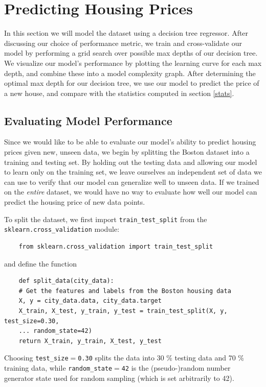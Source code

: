 \documentclass[12 pt]{article}
\numberwithin{equation}{section}
\begin{document}
\section{Predicting Housing Prices}\label{predict}
In this section we will model the dataset using a decision tree regressor. After discussing our choice of performance metric, we train and cross-validate our model by performing a grid  search over possible max depths of our decision tree. We visualize our model's performance by plotting the learning curve for each max depth, and combine these into a model complexity graph. After determining the  optimal max depth for our decision tree, we use our model to predict the price of a new house, and compare with the statistics computed in section \ref{stats}.
\subsection{Evaluating Model Performance}
Since we would like to be able to evaluate our model's ability to predict housing prices given new, unseen data, we begin by splitting the Boston dataset into a training and testing set. By holding out the testing data and allowing our model to learn only on the training set, we leave ourselves an independent set of data we can use to verify that our model can generalize well to unseen data. If we trained on the \emph{entire} dataset, we would have no way to evaluate how well our model can predict the housing price of new data points.

To split the dataset, we first import \texttt{train\_test\_split} from the \texttt{sklearn.cross\_validation} module:
\begin{verbatim}
	from sklearn.cross_validation import train_test_split
\end{verbatim}
and define the function 
\begin{verbatim}
	def split_data(city_data):
    # Get the features and labels from the Boston housing data
    X, y = city_data.data, city_data.target
    X_train, X_test, y_train, y_test = train_test_split(X, y, test_size=0.30,
    ... random_state=42)
    return X_train, y_train, X_test, y_test
\end{verbatim}
Choosing \texttt{test\_size$=$0.30} splits the data into 30 \% testing data and 70 \% training data, while \texttt{random\_state$=$42} is the (pseudo-)random number generator state used for random sampling (which is set arbitrarily to 42).
\end{document}
